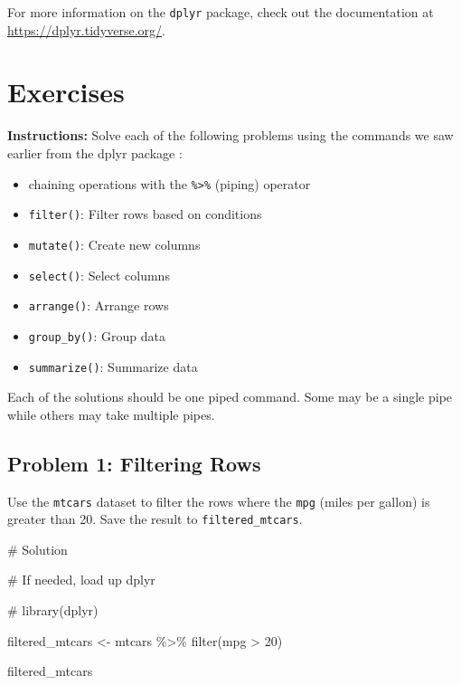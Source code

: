 \documentclass[
  letterpaper,
  DIV=11,
  numbers=noendperiod]{scrreprt}
\newenvironment{Shaded}{\begin{snugshade}}{\end{snugshade}}
\newcommand{\CommentTok}[1]{\textcolor[rgb]{0.37,0.37,0.37}{#1}}
\newcommand{\DecValTok}[1]{\textcolor[rgb]{0.68,0.00,0.00}{#1}}
\newcommand{\FunctionTok}[1]{\textcolor[rgb]{0.28,0.35,0.67}{#1}}
\newcommand{\NormalTok}[1]{\textcolor[rgb]{0.00,0.23,0.31}{#1}}
\newcommand{\OtherTok}[1]{\textcolor[rgb]{0.00,0.23,0.31}{#1}}
\newcommand{\SpecialCharTok}[1]{\textcolor[rgb]{0.37,0.37,0.37}{#1}}
\providecommand{\tightlist}{%
  \setlength{\itemsep}{0pt}\setlength{\parskip}{0pt}}\usepackage{longtable,booktabs,array}
\begin{document}
For more information on the \texttt{dplyr} package, check out the
documentation at \url{https://dplyr.tidyverse.org/}.

\section*{Exercises}\label{exercises-18}


\textbf{Instructions:} Solve each of the following problems using the
commands we saw earlier from the dplyr package :

\begin{itemize}
\tightlist
\item
  chaining operations with the \texttt{\%\textgreater{}\%} (piping)
  operator
\item
  \texttt{filter()}: Filter rows based on conditions
\item
  \texttt{mutate()}: Create new columns
\item
  \texttt{select()}: Select columns
\item
  \texttt{arrange()}: Arrange rows
\item
  \texttt{group\_by()}: Group data
\item
  \texttt{summarize()}: Summarize data
\end{itemize}

Each of the solutions should be one piped command. Some may be a single
pipe while others may take multiple pipes.

\subsection*{Problem 1: Filtering Rows}\label{problem-1-filtering-rows}

Use the \texttt{mtcars} dataset to filter the rows where the
\texttt{mpg} (miles per gallon) is greater than 20. Save the result to
\texttt{filtered\_mtcars}.

\begin{Shaded}
\begin{Highlighting}[]
\CommentTok{\# Solution}

\CommentTok{\# If needed, load up dplyr}

\CommentTok{\# library(dplyr)}

\NormalTok{filtered\_mtcars }\OtherTok{\textless{}{-}}\NormalTok{ mtcars }\SpecialCharTok{\%\textgreater{}\%}
  \FunctionTok{filter}\NormalTok{(mpg }\SpecialCharTok{\textgreater{}} \DecValTok{20}\NormalTok{)}

\NormalTok{filtered\_mtcars}
\end{Highlighting}
\end{Shaded}
\end{document}
